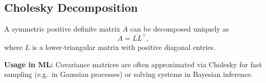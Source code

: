 \subsection{Cholesky Decomposition}
A symmetric positive definite matrix $A$ can be decomposed uniquely as
\[
A = L L^\top,
\]
where $L$ is a lower-triangular matrix with positive diagonal entries.

\textbf{Usage in ML:}  
Covariance matrices are often approximated via Cholesky for fast sampling (e.g.\ in Gaussian processes) 
or solving systems in Bayesian inference.

















